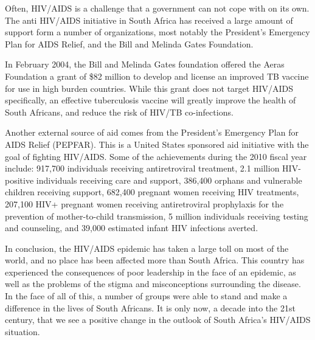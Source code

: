 \documentclass[12pt]{report}
\begin{document}
Often, HIV/AIDS is a challenge that a government can not cope with on its own.  
The anti HIV/AIDS initiative in South Africa has received a large amount of support form a number of organizations, most notably the President's Emergency Plan for AIDS Relief, and the Bill and Melinda Gates Foundation.


In February 2004, the Bill and Melinda Gates foundation offered the Aeras Foundation a grant of \$82 million to develop and license an improved TB vaccine for use in high burden countries\cite{gates}.
While this grant does not target HIV/AIDS specifically, an effective tuberculosis vaccine will greatly improve the health of South Africans, and reduce the risk of HIV/TB co-infections.

Another external source of aid comes from the President's Emergency Plan for AIDS Relief (PEPFAR).
This is a United States sponsored aid initiative with the goal of fighting HIV/AIDS.
Some of the achievements during the 2010 fiscal year include: 
    917,700 individuals receiving antiretroviral treatment, 
    2.1 million HIV-positive individuals receiving care and support, 
    386,400 orphans and vulnerable children receiving support, 
    682,400 pregnant women receiving HIV treatments, 
    207,100 HIV+ pregnant women receiving antiretroviral prophylaxis for the prevention of mother-to-child transmission, 
    5 million individuals receiving testing and counseling, 
    and 39,000 estimated infant HIV infections averted\cite{pepfar}.


In conclusion, the HIV/AIDS epidemic has taken a large toll on most of the world, and no place has been affected more than South Africa.
This country has experienced the consequences of poor leadership in the face of an epidemic, as well as the problems of the stigma and misconceptions surrounding the disease.
In the face of all of this, a number of groups were able to stand and make a difference in the lives of South Africans.
It is only now, a decade into the 21st century, that we see a positive change in the outlook of South Africa's HIV/AIDS situation.
\end{document}
